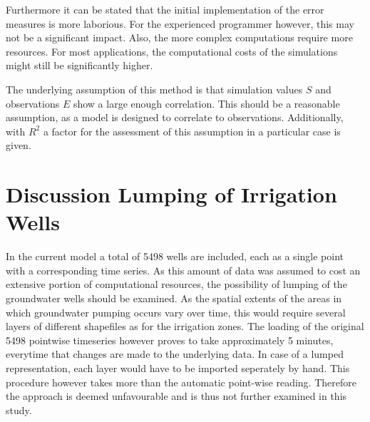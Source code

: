 Furthermore it can be stated that the initial implementation of the error measures is more laborious. For the experienced programmer however, this may not be a significant impact. Also, the more complex computations require more resources. For most applications, the computational costs of the simulations might still be significantly higher.

The underlying assumption of this method is that simulation values $S$ and observations $E$ show a large enough correlation. This should be a reasonable assumption, as a model is designed to correlate to observations. Additionally, with $R^2$ a factor for the assessment of this assumption in a particular case is given.


\section{Discussion Lumping of Irrigation Wells}
\label{Sec-DisLIW}

In the current model a total of 5498 wells are included, each as a single point with a corresponding time series. As this amount of data was assumed to cost an extensive portion of computational resources, the possibility of lumping of the groundwater wells should be examined. As the spatial extents of the areas in which groundwater pumping occurs vary over time, this would require several layers of different shapefiles as for the irrigation zones. The loading of the original 5498 pointwise timeseries however proves to take approximately 5 minutes, everytime that changes are made to the underlying data. In case of a lumped representation, each layer would have to be imported seperately by hand. This procedure however takes more than the automatic point-wise reading. Therefore the approach is deemed unfavourable and is thus not further examined in this study.